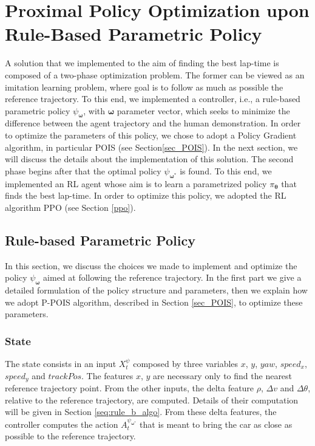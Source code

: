 \section{Proximal Policy Optimization upon Rule-Based Parametric Policy}
A solution that we implemented to the aim of finding the best lap-time is composed of a two-phase optimization problem.
The former can be viewed as an imitation learning problem, where goal is to follow as much as possible the reference trajectory.
To this end, we implemented a controller, i.e., a rule-based parametric policy $\psi_{\boldsymbol \omega}$, with $\boldsymbol \omega$ parameter vector, which seeks to minimize the difference between the agent trajectory and the human demonstration. 
In order to optimize the parameters of this policy, we chose to adopt a Policy Gradient algorithm, in particular POIS (see Section\ref{sec_POIS}).
In the next section, we will discuss the details about the implementation of this solution.
The second phase begins after that the optimal policy $\psi_{\boldsymbol \omega^*}$ is found. To this end, we implemented an RL agent whose aim is to learn a parametrized policy $\pi_{\boldsymbol \theta}$ that finds the best lap-time. In order to optimize this policy, we adopted the RL algorithm PPO (see Section \ref{ppo}).

\subsection{Rule-based Parametric Policy}
In this section, we discuss the choices we made to implement and optimize the policy $\psi_{\boldsymbol \omega}$ aimed at following the reference trajectory. In the first part we give a detailed formulation of the policy structure and parameters, then we explain how we adopt P-POIS algorithm, described in Section \ref{sec_POIS}, to optimize these parameters.

\subsubsection{State}
\label{RB_state}
The state consists in an input $X^{\psi}_t$ composed by three variables $x$, $y$, $yaw$, $speed_x$, $speed_y$ and $trackPos$. The features $x$, $y$ are necessary only to find the nearest reference trajectory point. From the other inputs, the delta feature $\rho$, $\Delta v$ and $\Delta \theta$, relative to the reference trajectory, are computed. Details of their computation will be given in Section \ref{seq:rule_b_algo}.
From these delta features, the controller computes the action $A^{\psi_{\boldsymbol \omega^*}}_t$ that is meant to bring the car as close as possible to the reference trajectory.

